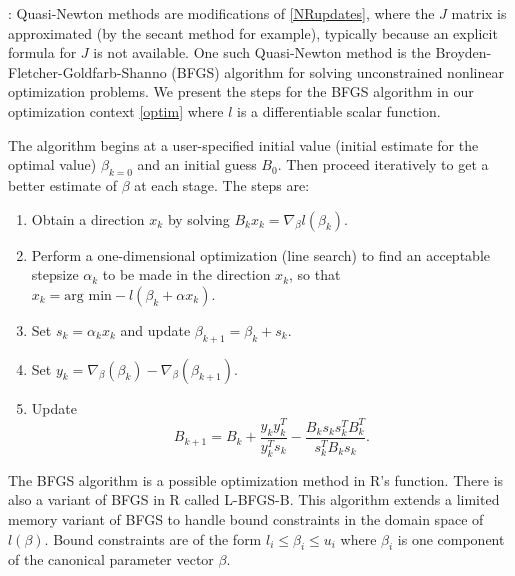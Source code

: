 \documentclass[12pt]{article}
\begin{document}



\vspace*{0.5cm}: Quasi-Newton methods are modifications of \eqref{NRupdates}, where the $J$ matrix is approximated (by the secant method for example), typically because an explicit formula for $J$ is not available. One such Quasi-Newton method is the Broyden-Fletcher-Goldfarb-Shanno (BFGS) algorithm for solving unconstrained nonlinear optimization problems. We present the steps for the BFGS algorithm in our optimization context \eqref{optim} where $l$ is a differentiable scalar function. 

The algorithm begins at a user-specified initial value (initial estimate for the optimal value) $\beta_{k=0}$ and an initial guess $B_0$. Then proceed iteratively to get a better estimate of $\beta$ at each stage. The steps are:
\begin{enumerate}
	\item Obtain a direction $x_k$ by solving $B_kx_k = \nabla_\beta l(\beta_k)$.
	\item Perform a one-dimensional optimization (line search) to find an acceptable stepsize $\alpha_k$ to be made in the direction $x_k$, so that $x_k = \text{arg min} -l(\beta_k + \alpha x_k)$.
	\item Set $s_k = \alpha_k x_k$ and update $\beta_{k+1} = \beta_k + s_k$.
	\item Set $y_k = \nabla_{\beta}(\beta_k) - \nabla_{\beta}(\beta_{k+1})$.
	\item Update 
	$$
	  B_{k+1} = B_k + \frac{y_ky_k^T}{y_k^Ts_k} - \frac{B_ks_ks_k^TB_k^T}{s_k^TB_k s_k}.
	$$
\end{enumerate}
The BFGS algorithm is a possible optimization method in R's  function. There is also a variant of BFGS in R called L-BFGS-B. This algorithm extends a limited memory variant of BFGS to handle bound constraints in the domain space of $l(\beta)$.  Bound constraints are of the form $l_i \leq \beta_i \leq u_i$ where $\beta_i$ is one component of the canonical parameter vector $\beta$. 
\end{document}
